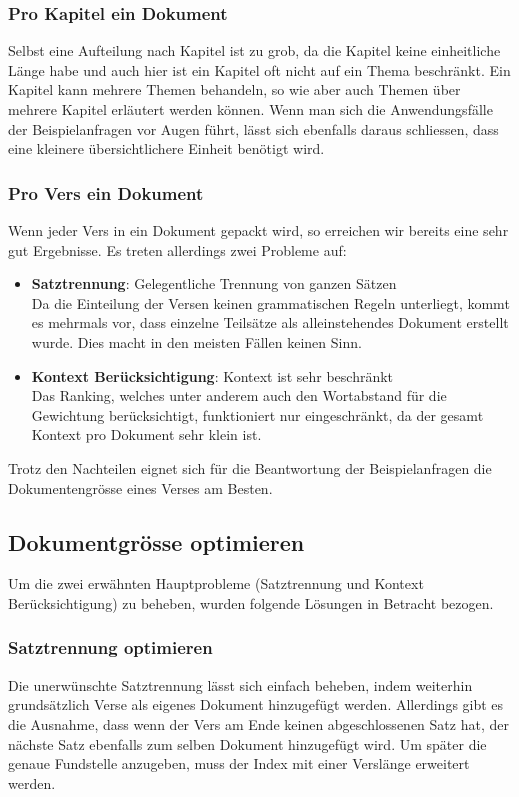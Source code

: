 \subsubsection{Pro Kapitel ein Dokument}
Selbst eine Aufteilung nach Kapitel ist zu grob, da die Kapitel keine einheitliche Länge habe und auch hier ist ein Kapitel oft nicht auf ein Thema beschränkt.
Ein Kapitel kann mehrere Themen behandeln, so wie aber auch Themen über mehrere Kapitel erläutert werden können.
Wenn man sich die Anwendungsfälle der Beispielanfragen vor Augen führt, lässt sich ebenfalls daraus schliessen, dass eine kleinere übersichtlichere Einheit benötigt wird.

\subsubsection{Pro Vers ein Dokument}
Wenn jeder Vers in ein Dokument gepackt wird, so erreichen wir bereits eine sehr gut Ergebnisse.
Es treten allerdings zwei Probleme auf:
\begin{itemize}
	\item \textbf{Satztrennung}: Gelegentliche Trennung von ganzen Sätzen\\
	Da die Einteilung der Versen keinen grammatischen Regeln unterliegt, kommt es mehrmals vor, dass einzelne Teilsätze als alleinstehendes Dokument erstellt wurde. Dies macht in den meisten Fällen keinen Sinn.
	\item \textbf{Kontext Berücksichtigung}: Kontext ist sehr beschränkt\\
	Das Ranking, welches unter anderem auch den Wortabstand für die Gewichtung berücksichtigt, funktioniert nur eingeschränkt, da der gesamt Kontext pro Dokument sehr klein ist.
\end{itemize}

Trotz den Nachteilen eignet sich für die Beantwortung der Beispielanfragen die Dokumentengrösse eines Verses am Besten.

\subsection{Dokumentgrösse optimieren}
Um die zwei erwähnten Hauptprobleme (Satztrennung und Kontext Berücksichtigung) zu beheben, wurden folgende Lösungen in Betracht bezogen.

\subsubsection{Satztrennung optimieren}
Die unerwünschte Satztrennung lässt sich einfach beheben, indem weiterhin grundsätzlich Verse als eigenes Dokument hinzugefügt werden.
Allerdings gibt es die Ausnahme, dass wenn der Vers am Ende keinen abgeschlossenen Satz hat, der nächste Satz ebenfalls zum selben Dokument hinzugefügt wird.
Um später die genaue Fundstelle anzugeben, muss der Index mit einer Verslänge erweitert werden.

